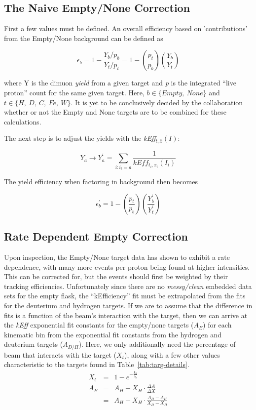 \subsection{The Naive Empty/None Correction}

First a few values must be defined. An overall efficiency based on 'contributions' from the Empty/None background can be defined as

\begin{equation}
\epsilon_b = 1 - \frac{Y_b/p_b}{Y_t/p_t} = 1 - \left(\frac{p_t}{p_b}\right) \left( \frac{Y_b}{Y_t} \right)
\end{equation}

where Y is the dimuon \emph{yield} from a given target and \emph{p} is the integrated ``live proton'' count for the same given target. Here, $b \in \{Empty,\ None\}$ and $t\in\{H,\ D,\ C,\ Fe,\ W\}$. It is yet to be conclusively decided by the collaboration whether or not the Empty and None targets are to be combined for these calculations.

The next step is to adjust the yields with the \emph{kEff}$_{t,\bar{x}}(I)$:

\begin{equation}
Y_a \rightarrow Y_a^\prime = \sum_{i:i_t=a} \frac{1}{kEff_{t_i, x_i}(I_i)}
\end{equation}

The yield efficiency when factoring in background then becomes

\begin{equation}
\epsilon^\prime_b = 1 - \left(\frac{p_t}{p_b}\right) \left( \frac{Y^\prime_b}{Y^\prime_t} \right)
\end{equation}

\subsection{Rate Dependent Empty Correction}

Upon inspection, the Empty/None target data has shown to exhibit a rate dependence, with many more events per proton being found at higher intensities. This can be corrected for, but the events should first be weighted by their tracking efficiencies. Unfortunately since there are no \emph{messy/clean} embedded data sets for the empty flask, the ``kEfficiency'' fit must be extrapolated from the fits for the deuterium and hydrogen targets. If we are to assume that the difference in fits is a function of the beam's interaction with the target, then we can arrive at the \emph{kEff} exponential fit constants for the empty/none targets ($A_E$) for each kinematic bin from the exponential fit constants from the hydrogen and deuterium targets ($A_{D/H}$). Here, we only additionally need the percentage of beam that interacts with the target ($X_t$), along with a few other values characteristic to the targets found in Table~\ref{tab:targ-details}.
\begin{eqnarray}
X_t & = & 1 - e^{-\frac{L_t}{\lambda_t}} \\
A_E & = & A_H - X_H \cdot \frac{\Delta A}{\Delta X} \\
	   & = & A_H - X_H \cdot \frac{A_D - A_H}{X_D - X_H}
\end{eqnarray}

